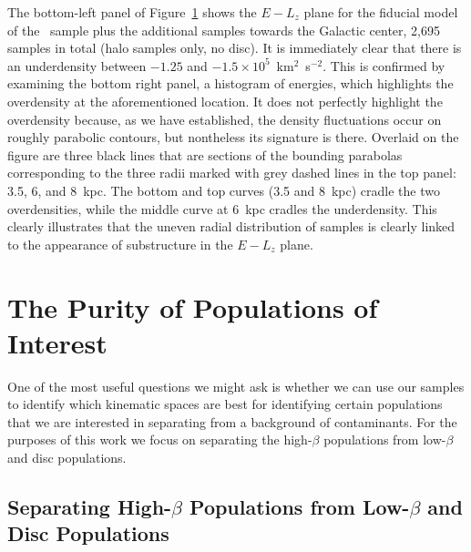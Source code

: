 \begin{figure}
    \label{fig:APOGEERadialBias}
\end{figure}

The bottom-left panel of Figure~\ref{fig:APOGEERadialBias} shows the $E-L_{z}$ plane for the fiducial model of the \survey\ sample plus the additional samples towards the Galactic center, 2,695 samples in total (halo samples only, no disc). It is immediately clear that there is an underdensity between $-1.25$ and $-1.5\times10^{5}$~km$^{2}$~s$^{-2}$. This is confirmed by examining the bottom right panel, a histogram of energies, which highlights the overdensity at the aforementioned location. It does not perfectly highlight the overdensity because, as we have established, the density fluctuations occur on roughly parabolic contours, but nontheless its signature is there. Overlaid on the figure are three black lines that are sections of the bounding parabolas corresponding to the three radii marked with grey dashed lines in the top panel: 3.5, 6, and 8~kpc. The bottom and top curves (3.5 and 8~kpc) cradle the two overdensities, while the middle curve at 6~kpc cradles the underdensity. This clearly illustrates that the uneven radial distribution of samples is clearly linked to the appearance of substructure in the $E-L_{z}$ plane.

\section{The Purity of Populations of Interest}
\label{sec:PurityOfPopulations}

One of the most useful questions we might ask is whether we can use our samples to identify which kinematic spaces are best for identifying certain populations that we are interested in separating from a background of contaminants. For the purposes of this work we focus on separating the high-$\beta$ populations from low-$\beta$ and disc populations.

\subsection{Separating High-\texorpdfstring{$\beta$}{beta} Populations from Low-\texorpdfstring{$\beta$}{beta} and Disc Populations}
\label{subsec:SeparatingHighBetaPopulations}

